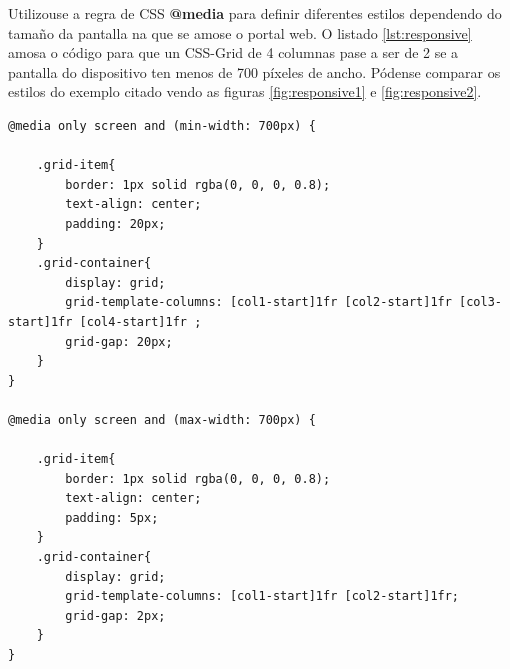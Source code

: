 Utilizouse a regra de CSS \textbf{@media} para definir diferentes estilos dependendo do tamaño da pantalla na que se amose o portal web. O listado \ref{lst:responsive} amosa o código para que un CSS-Grid de 4 columnas pase a ser de 2 se a pantalla do dispositivo ten menos de 700 píxeles de ancho. Pódense comparar os estilos do exemplo citado vendo as figuras \ref{fig:responsive1} e \ref{fig:responsive2}. 

\begin{lstlisting}[caption=Extracto da folla de estilos de index.html, label=lst:responsive]
@media only screen and (min-width: 700px) {

	.grid-item{
		border: 1px solid rgba(0, 0, 0, 0.8);
		text-align: center;
		padding: 20px;
	}
	.grid-container{
		display: grid;
		grid-template-columns: [col1-start]1fr [col2-start]1fr [col3-start]1fr [col4-start]1fr ;
		grid-gap: 20px;
	}
}

@media only screen and (max-width: 700px) {

	.grid-item{
		border: 1px solid rgba(0, 0, 0, 0.8);
		text-align: center;
		padding: 5px;
	}
	.grid-container{
		display: grid;
		grid-template-columns: [col1-start]1fr [col2-start]1fr;
		grid-gap: 2px;
	}
}
\end{lstlisting}



